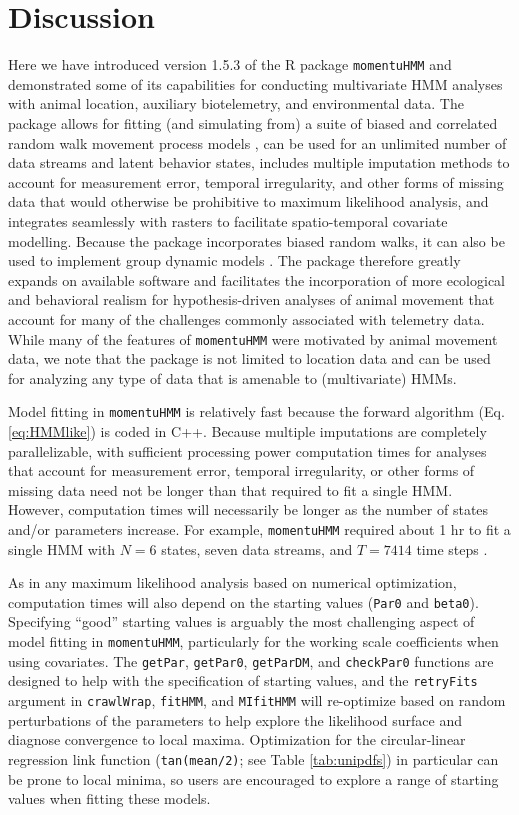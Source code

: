 \documentclass[12pt]{article}\usepackage[]{graphicx}\usepackage[]{color}
\begin{document}
\section{Discussion}
Here we have introduced version 1.5.3 of the R package \verb|momentuHMM| and demonstrated some of its capabilities for conducting multivariate HMM analyses with animal location, auxiliary biotelemetry, and environmental data. The package allows for fitting (and simulating from) a suite of biased and correlated random walk movement process models \citep[e.g.][]{McClintockEtAl2012}, can be used for an unlimited number of data streams and latent behavior states, includes multiple imputation methods to account for measurement error, temporal irregularity, and other forms of missing data that would otherwise be prohibitive to maximum likelihood analysis, and integrates seamlessly with rasters to facilitate spatio-temporal covariate modelling. Because the package incorporates biased random walks, it can also be used to implement group dynamic models \cite[e.g.][]{LangrockEtAl2014}. The package therefore greatly expands on available software and facilitates the incorporation of more ecological and behavioral realism for hypothesis-driven analyses of animal movement that account for many of the challenges commonly associated with telemetry data. While many of the features of \verb|momentuHMM| were motivated by animal movement data, we note that the package is not limited to location data and can be used for analyzing any type of data that is amenable to (multivariate) HMMs.

Model fitting in \verb|momentuHMM| is relatively fast because the forward algorithm (Eq. \ref{eq:HMMlike}) is coded in C++. Because multiple imputations are completely parallelizable, with sufficient processing power computation times for analyses that account for measurement error, temporal irregularity, or other forms of missing data need not be longer than that required to fit a single HMM.  However, computation times will necessarily be longer as the number of states and/or parameters increase. For example, \verb|momentuHMM| required about 1 hr to fit a single HMM with $N=6$ states, seven data streams, and $T=7414$ time steps \citep{McClintock2017}. 

As in any maximum likelihood analysis based on numerical optimization, computation times will also depend on the starting values (\verb|Par0| and \verb|beta0|). Specifying ``good'' starting values is arguably the most challenging aspect of model fitting in \verb|momentuHMM|, particularly for the working scale coefficients when using covariates. The \verb|getPar|, \verb|getPar0|, \verb|getParDM|, and \verb|checkPar0| functions are designed to help with the specification of starting values, and the \verb|retryFits| argument in \verb|crawlWrap|, \verb|fitHMM|, and \verb|MIfitHMM| will re-optimize based on random perturbations of the parameters to help explore the likelihood surface and diagnose convergence to local maxima. Optimization for the circular-linear regression link function (\verb|tan(mean/2)|; see Table \ref{tab:unipdfs}) in particular can be prone to local minima, so users are encouraged to explore a range of starting values when fitting these models.
\end{document}
